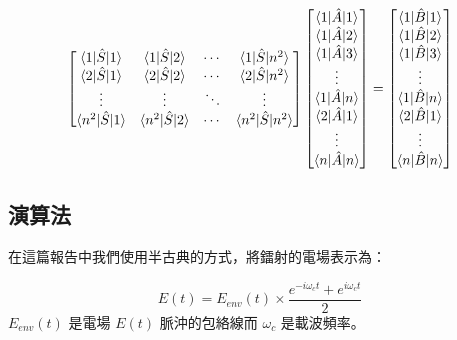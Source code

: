 \documentclass[11pt,a4paper]{article}
\begin{document}
\begin{equation}
\begin{bmatrix}
\braket{ 1 | \hat{S}|1 } & \braket{ 1 | \hat{S}|2 } & \cdots & \braket{ 1 | \hat{S}|n^2 } \\
\braket{ 2 | \hat{S}|1 } & \braket{ 2 | \hat{S}|2 } & \cdots & \braket{ 2 | \hat{S}|n^2 } \\
\vdots  & \vdots  & \ddots & \vdots  \\
\braket{ n^2 | \hat{S}|1 } & \braket{ n^2 | \hat{S}|2 } & \cdots & \braket{ n^2 | \hat{S}|n^2 }
\end{bmatrix}
\begin{bmatrix}
\braket{ 1 | \hat{A}|1 }\\
\braket{ 1 | \hat{A}|2 }\\
\braket{ 1 | \hat{A}|3 }\\
\vdots\\
\braket{ 1 | \hat{A}|n }\\
\braket{ 2 | \hat{A}|1 }\\
\vdots\\
\braket{ n | \hat{A}|n }\\
\end{bmatrix}
=
\begin{bmatrix}
\braket{ 1 | \hat{B}|1 }\\
\braket{ 1 | \hat{B}|2 }\\
\braket{ 1 | \hat{B}|3 }\\
\vdots\\
\braket{ 1 | \hat{B}|n }\\
\braket{ 2 | \hat{B}|1 }\\
\vdots\\
\braket{ n | \hat{B}|n }\\
\end{bmatrix}
\end{equation}

\subsection{演算法}
在這篇報告中我們使用半古典的方式，將鐳射的電場表示為：

\begin{equation}
E(t) = E_{env}(t)\times  \frac{e^{-i\omega_c t}+e^{i\omega_c t}}{2}
\end{equation}
$E_{env}(t)$ 是電場 $E(t)$ 脈沖的包絡線而 $\omega_c$ 是載波頻率。\\

\end{document}

